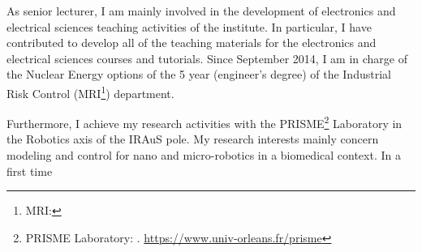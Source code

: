 As senior lecturer, I am mainly involved in the development of electronics and electrical sciences teaching activities of the institute.
In particular, I have contributed to develop all of the teaching materials for the electronics and electrical sciences  courses and tutorials.
Since September 2014, I am in charge of the Nuclear Energy options of the 5 year (engineer's degree) of the Industrial Risk Control (MRI\footnote{MRI: }) department.

Furthermore, I achieve my research activities with the PRISME\footnote{PRISME Laboratory: . \url{https://www.univ-orleans.fr/prisme}} Laboratory in the Robotics axis of the IRAuS pole.
My research interests mainly concern modeling and control for nano and micro-robotics in a biomedical context.
In a first time